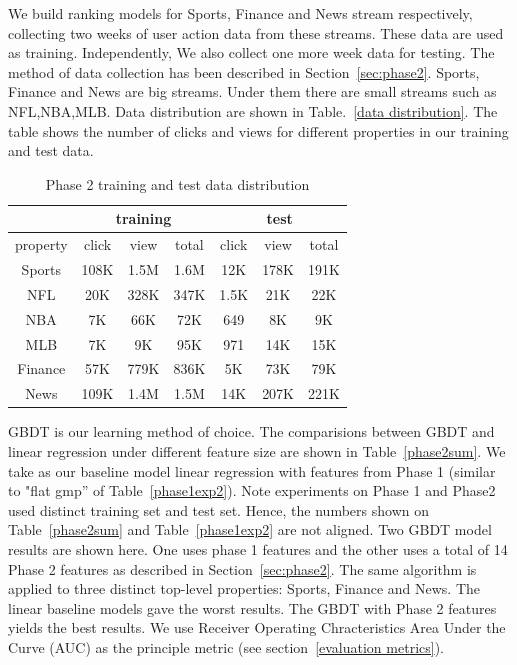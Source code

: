 We build ranking models for Sports, Finance and News stream respectively, 
collecting two weeks of user action data from these streams. These data are 
used as training. Independently, We also collect one more week data for 
testing. The method of data collection has been described in 
Section~\ref{sec:phase2}. Sports, Finance and News are big streams. Under them 
there are small streams such as NFL,NBA,MLB.  Data distribution are shown in Table.~\ref{data 
distribution}. The table shows the number of clicks and views for different 
properties in our training and test data. 



\begin{table}
\begin{center}
\caption{Phase 2 training and test data distribution}
 \label{data distribution}
\begin{tabular}{|c|c|c|c|c|c|c|}\hline
 &  \multicolumn{3}{c|}{training} & \multicolumn{3}{c|}{test} \\ \hline
property     & click & view & total & click & view & total\\ \hline
Sports &  108K & 1.5M  & 1.6M & 12K & 178K & 191K \\ \hline
NFL &   20K & 328K  & 347K & 1.5K & 21K & 22K \\ \hline
NBA  &  7K & 66K & 72K & 649  & 8K & 9K \\ \hline
MLB & 7K & 9K & 95K & 971 &14K & 15K \\ \hline
Finance & 57K & 779K  & 836K & 5K &73K & 79K \\ \hline
News & 109K & 1.4M &1.5M  &14K &207K &221K \\ \hline
\end{tabular}

\end{center}

\end{table}


GBDT is our learning method of choice.  The comparisions between GBDT and 
linear regression under different feature size  are shown in 
Table~\ref{phase2sum}. We take as our baseline model linear regression with 
features from Phase 1 (similar to "flat gmp'' of Table~\ref{phase1exp2}). 
Note experiments on Phase 1 and Phase2 used distinct training set and test 
set. Hence, the numbers shown on Table~\ref{phase2sum} and 
Table~\ref{phase1exp2} are not aligned. Two GBDT model results are shown 
here. One uses phase 1 features and the other uses a total of 14 Phase 2 
features as described in Section~\ref{sec:phase2}.  The same algorithm is 
applied to three distinct top-level properties: Sports, Finance and News. The 
linear baseline models gave the worst results. The GBDT with Phase 2 features 
yields the best results. We use Receiver Operating Chracteristics Area Under 
the Curve (AUC) as the principle metric (see section~\ref{evaluation 
metrics}).  


